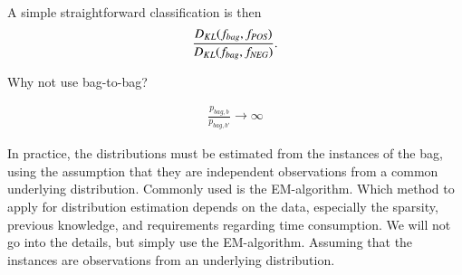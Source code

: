 A simple straightforward classification is then
\begin{align}
  \frac{D_{KL} (f_{bag},f_{\text{\scriptsize{{\it POS}}}})}{D_{KL} (f_{bag},f_{\text{\scriptsize{{\it NEG}}}})}.
\end{align}



Why not use bag-to-bag?

\begin{align}
  \frac{p_{bag,b}}{p_{bag,b'}} \rightarrow \infty
\end{align}


In practice, the distributions must be estimated from the instances of the bag, using the assumption that they are independent observations from a common underlying distribution. 
Commonly used is the EM-algorithm.
Which method to apply for distribution estimation depends on the data, especially the sparsity, previous knowledge, and requirements regarding time consumption. 
We will not go into the details, but simply use the EM-algorithm.
Assuming that the instances are observations from an underlying distribution. 


